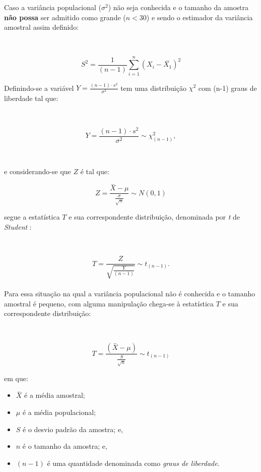 \documentclass[
]{book}
\providecommand{\tightlist}{%
  \setlength{\itemsep}{0pt}\setlength{\parskip}{0pt}}
\begin{document}
\hfill\break

Caso a variância populacional (\(\sigma^{2}\)) não seja conhecida e o tamanho da amostra \textbf{não possa} ser admitido como grande (\(n<30\)) e sendo o estimador da variância amostral assim definido:

~

\[
{S}^{2}=\frac{1}{\left(n-1\right)}\sum _{i=1}^{n}{\left({X}_{i}-\stackrel{-}{{X}_{1}}\right)}^{2}
\]

\hfill\break

Definindo-se a variável \(Y = \frac{(n-1)\cdot s^{2}}{\sigma^{2}}\) tem uma distribuição \(\chi^{2}\) com (n-1) graus de liberdade tal que:

~

\[
Y = \frac{(n-1)\cdot s^{2}}{\sigma^{2}} \sim \chi^{2}_{(n-1)},
\]

~

e considerando-se que \(Z\) é tal que:
~

\[
Z = \frac{\stackrel{-}{X} - \mu}{\frac{\sigma}{\sqrt{n}}}  \sim N(0 ,1)
\]

\hfill\break

segue a estatística \(T\) e sua correspondente distribuição, denominada por \emph{t} de \emph{Student} :

~

\[
T=\frac{Z}{\sqrt{\frac{Y}{\left(n-1\right)}}} \sim {t}_{\left(n-1\right)}.
\]\\

Para essa situação na qual a variância populacional não é conhecida e o tamanho amostral é pequeno, com alguma manipulação chega-se à estatística \(T\) e sua correspondente distribuição:

~

\[
T = \frac{(\stackrel{-}{X} - \mu)}{    \frac{S}{\sqrt{n}} } \sim t_{(n-1)}
\]

\hfill\break

em que:

\hfill\break

\begin{itemize}
\tightlist
\item
  \(\stackrel{-}{X}\) é a média amostral;\\
\item
  \(\mu\) é a média populacional;
\item
  \(S\) é o desvio padrão da amostra; e,\\
\item
  \(n\) é o tamanho da amostra; e,\\
\item
  \((n-1)\) é uma quantidade denominada como \emph{graus de liberdade}.
\end{itemize}
\end{document}
